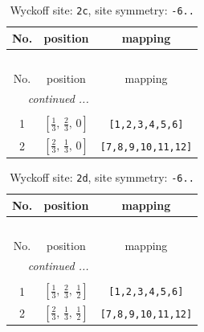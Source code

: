 \documentclass[fleqn,8pt]{jsarticle}
\begin{document}
\begin{longtable}{ccc}
\caption{Wyckoff site: {\tt 2c}, site symmetry: {\tt -6..}}
 \\
 \hline \hline
No. & position & mapping \\ \hline \endfirsthead

\multicolumn{2}{l}{\tablename\ \thetable{}} \\
 \hline \hline
No. & position & mapping \\ \hline \endhead

 \hline \hline
\multicolumn{2}{r}{\footnotesize\it continued ...} \\ \endfoot

 \hline \hline
\multicolumn{2}{r}{} \\ \endlastfoot

1 & $\left[ \frac{1}{3},\, \frac{2}{3},\, 0 \right]$ & {\tt [1,2,3,4,5,6]} \\ \hline
2 & $\left[ \frac{2}{3},\, \frac{1}{3},\, 0 \right]$ & {\tt [7,8,9,10,11,12]} \\
\end{longtable}
\renewcommand{\arraystretch}{1.2}
\begin{longtable}{ccc}
\caption{Wyckoff site: {\tt 2d}, site symmetry: {\tt -6..}}
 \\
 \hline \hline
No. & position & mapping \\ \hline \endfirsthead

\multicolumn{2}{l}{\tablename\ \thetable{}} \\
 \hline \hline
No. & position & mapping \\ \hline \endhead

 \hline \hline
\multicolumn{2}{r}{\footnotesize\it continued ...} \\ \endfoot

 \hline \hline
\multicolumn{2}{r}{} \\ \endlastfoot

1 & $\left[ \frac{1}{3},\, \frac{2}{3},\, \frac{1}{2} \right]$ & {\tt [1,2,3,4,5,6]} \\ \hline
2 & $\left[ \frac{2}{3},\, \frac{1}{3},\, \frac{1}{2} \right]$ & {\tt [7,8,9,10,11,12]} \\
\end{longtable}
\renewcommand{\arraystretch}{1.2}
\end{document}
